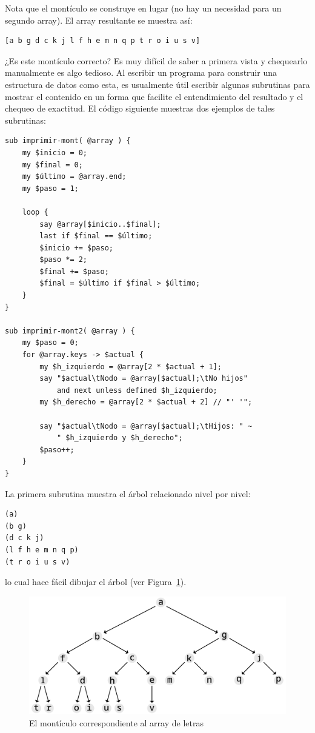 Nota que el montículo se construye en lugar (no hay
un necesidad para un segundo array). El array resultante
se muestra así:

\begin{verbatim}
[a b g d c k j l f h e m n q p t r o i u s v]
\end{verbatim}

¿Es este montículo correcto? Es muy difícil de saber
a primera vista y chequearlo manualmente es algo tedioso.
Al escribir un programa para construir una estructura de
datos como esta, es usualmente útil escribir algunas 
subrutinas para mostrar el contenido en un forma que 
facilite el entendimiento del resultado y el chequeo de
exactitud. El código siguiente muestras dos ejemplos
de tales subrutinas:

\begin{verbatim}
sub imprimir-mont( @array ) {
    my $inicio = 0;
    my $final = 0;
    my $último = @array.end;
    my $paso = 1;
    
    loop {
        say @array[$inicio..$final];
        last if $final == $último;
        $inicio += $paso;
        $paso *= 2;
        $final += $paso;
        $final = $último if $final > $último;
    } 
}

sub imprimir-mont2( @array ) {
    my $paso = 0;
	for @array.keys -> $actual {
	    my $h_izquierdo = @array[2 * $actual + 1];
        say "$actual\tNodo = @array[$actual];\tNo hijos" 
            and next unless defined $h_izquierdo;
        my $h_derecho = @array[2 * $actual + 2] // "' '";

        say "$actual\tNodo = @array[$actual];\tHijos: " ~ 
            " $h_izquierdo y $h_derecho";
        $paso++;
    }
}

\end{verbatim}

La primera subrutina muestra el árbol relacionado
nivel por nivel:

\begin{verbatim}
(a)
(b g)
(d c k j)
(l f h e m n q p)
(t r o i u s v)
\end{verbatim}

lo cual hace fácil dibujar el árbol (ver Figura~\ref{fig.heap2}).

\begin{figure}
\centerline
{\includegraphics[scale=0.8]{figs/figure_heap2.pdf}}
\caption{El montículo correspondiente al array de letras}
\label{fig.heap2}
\end{figure}


